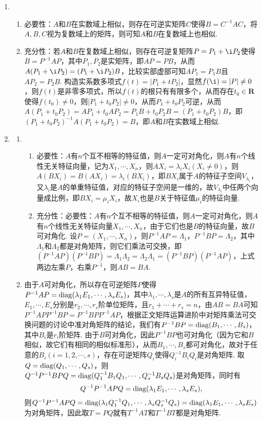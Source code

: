 \begin{enumerate}
    \item \begin{enumerate}
        \item 必要性：$A$和$B$在实数域上相似，则存在可逆实矩阵$C$使得$B=C^{-1}AC$，将$A,B,C$视为复数域上的矩阵，则可知$A$和$B$在复数域上也相似.
        \item 充分性：若$A$和$B$在复数域上相似，则存在可逆复矩阵$P=P_1+\i P_2$使得$B=P^{-1}AP$，其中$P_1,P_2$是实矩阵，即$AP=PB$，从而$A(P_1+\i P_2)=(P_1+\i P_2)B$，比较实部虚部可知$AP_1=P_1B$且$AP_2=P_2B$. 构造实系数多项式$f(t)=|P_1+tP_2|$，显然$f(\i)=|P|\neq 0$，则$f(t)$是非零多项式，所以$f(t)$的根只有有限多个，从而存在$t_0\in\mathbf{R}$使得$f(t_0)\neq 0$，则$|P_1+t_0P_2|\neq 0$，从而$P_1+t_0P_2$可逆，从而$A(P_1+t_0P_2)=AP_1+t_0AP_2=P_1B+t_0P_2B=(P_1+t_0P_2)B$，即$(P_1+t_0P_2)^{-1}A(P_1+t_0P_2)=B$，即$A$和$B$在实数域上相似.
    \end{enumerate}

    \item \label{ex:19:交换对角化}
    \begin{enumerate}
        \item \begin{enumerate}
            \item 必要性：$A$有$n$个互不相等的特征值，则$A$一定可对角化，则$A$有$n$个线性无关特征向量，记为$X_1,\cdots,X_n$，则$AX_i=\lambda_iX_i(X_i\neq 0)$，则$A(BX_i)=B(AX_i)=\lambda_i(BX_i)$，即$BX_i$属于$A$的特征子空间$V_{\lambda_i}$，又$\lambda_i$是$A$的单重特征值，对应的特征子空间是一维的，故$V_{\lambda_i}$中任两个向量成比例，即$BX_i=\mu_iX_i$，故$X_i$也是$B$关于特征值$\mu_i$的特征向量.
            \item 充分性：必要性：$A$有$n$个互不相等的特征值，则$A$一定可对角化，则$A$有$n$个线性无关特征向量$X_1,\cdots,X_n$，由于它们也是$B$的特征向量，故$B$可对角化. 设$P=(X_1,\cdots,X_n)$，则$P^{-1}AP=\Lambda_1$，$P^{-1}BP=\Lambda_2$，其中$\Lambda_1$和$\Lambda_2$都是对角矩阵，则它们乘法可交换，即$(P^{-1}AP)(P^{-1}BP)=\Lambda_1\Lambda_2=\Lambda_2\Lambda_1=(P^{-1}BP)(P^{-1}AP)$，上式两边左乘$P$，右乘$P^{-1}$，则$AB=BA$.
        \end{enumerate}
        \item 由于$A$可对角化，所以存在可逆矩阵$P$使得$P^{-1}AP=\operatorname{diag}(\lambda_1E_1,\cdots,\lambda_sE_s)$，其中$\lambda_1,\cdots,\lambda_s$是$A$的所有互异特征值，$E_1,\cdots,E_s$分别是$r_2,\cdots,r_s$阶单位矩阵，且$r_1+\cdots+r_s=n$，由$AB=BA$可知$P^{-1}APP^{-1}BP=P^{-1}BPP^{-1}AP$，根据正文矩阵运算进阶中对矩阵乘法可交换问题的讨论中准对角矩阵的结论，我们有$P^{-1}BP=\operatorname{diag}(B_1,\cdots,B_s)$，其中$B_i$是$r_i$阶矩阵. 由于$B$可对角化，因此$P^{-1}BP$也可对角化（因为它和$B$相似，故它们有相同的相似标准形），从而$B_1,\cdots,B_s$都可对角化，故对于任意的$B_i(i=1,2,\cdots,s)$，存在可逆矩阵$Q_i$使得$Q_i^{-1}B_iQ_i$是对角矩阵. 取$Q=\operatorname{diag}(Q_1,\cdots,Q_s)$，则$Q^{-1}P^{-1}BPQ=\operatorname{diag}(Q_1^{-1}B_1Q_1,\cdots,Q_s^{-1}B_sQ_s)$是对角矩阵，同时有
        \[Q^{-1}P^{-1}APQ=\operatorname{diag}(\lambda_1E_1,\cdots,\lambda_sE_s),\]
        则$Q^{-1}P^{-1}APQ=\operatorname{diag}(\lambda_1Q_1^{-1}Q_1,\cdots,\lambda_sQ_s^{-1}Q_s)=\operatorname{diag}(\lambda_1E_1,\cdots,\lambda_sE_s)$为对角矩阵，因此取$T=PQ$就有$T^{-1}AT$和$T^{-1}BT$都是对角矩阵.
    \end{enumerate}


\end{enumerate}
